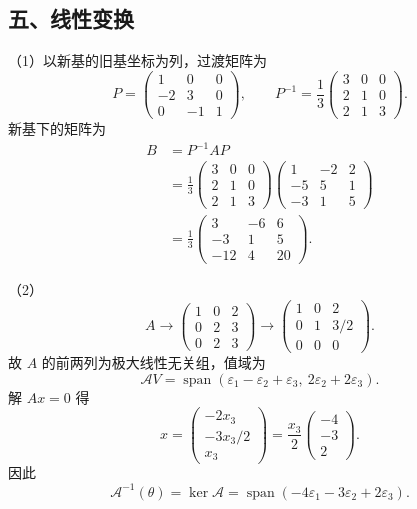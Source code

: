 \documentclass[11pt,fontset=fandol]{ctexart}
\begin{document}
\subsection{五、线性变换}\label{ux4e94ux7ebfux6027ux53d8ux6362}

（1）以新基的旧基坐标为列，过渡矩阵为 \[
P=\begin{pmatrix}1&0&0\\-2&3&0\\0&-1&1\end{pmatrix},\qquad
P^{-1}=\frac13\begin{pmatrix}3&0&0\\2&1&0\\2&1&3\end{pmatrix}.
\] 新基下的矩阵为 \[
\begin{aligned}
B&=P^{-1}AP\\
&=\frac13\begin{pmatrix}3&0&0\\2&1&0\\2&1&3\end{pmatrix}
\begin{pmatrix}1&-2&2\\-5&5&1\\-3&1&5\end{pmatrix}\\
&=\frac13\begin{pmatrix}3&-6&6\\-3&1&5\\-12&4&20\end{pmatrix}.
\end{aligned}
\]

（2） \[
A\longrightarrow\begin{pmatrix}1&0&2\\0&2&3\\0&2&3\end{pmatrix}
\longrightarrow\begin{pmatrix}1&0&2\\0&1&3/2\\0&0&0\end{pmatrix}.
\] 故 \(A\) 的前两列为极大线性无关组，值域为 \[
\mathcal AV=\operatorname{span}(\varepsilon_1-\varepsilon_2+\varepsilon_3,\ 2\varepsilon_2+2\varepsilon_3).
\] 解 \(Ax=0\) 得 \[
x=\begin{pmatrix}-2x_3\\-3x_3/2\\x_3\end{pmatrix}
=\frac{x_3}{2}\begin{pmatrix}-4\\-3\\2\end{pmatrix}.
\] 因此 \[
\mathcal A^{-1}(\theta)=\ker\mathcal A
=\operatorname{span}(-4\varepsilon_1-3\varepsilon_2+2\varepsilon_3).
\]
\end{document}
